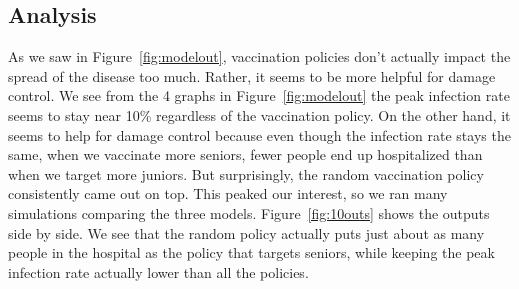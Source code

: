 \documentclass{article}
\begin{document}
\subsection{Analysis}
\par As we saw in Figure~\ref{fig:modelout}, vaccination policies don't actually impact the spread of the disease too much. Rather, it seems to be more helpful for damage control. We see from the 4 graphs in Figure~\ref{fig:modelout} the peak infection rate seems to stay near 10\% regardless of the vaccination policy. On the other hand, it seems to help for damage control because even though the infection rate stays the same, when we vaccinate more seniors, fewer people end up hospitalized than when we target more juniors. But surprisingly, the random vaccination policy consistently came out on top. This peaked our interest, so we ran many simulations comparing the three models. Figure~\ref{fig:10outs} shows the outputs side by side. We see that the random policy actually puts just about as many people in the hospital as the policy that targets seniors, while keeping the peak infection rate actually lower than all the policies.
\end{document}
